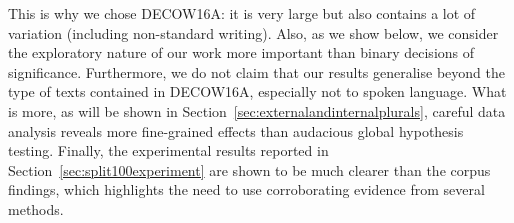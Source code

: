 This is why we chose DECOW16A: it is very large but also contains a lot of variation (including non-standard writing).
Also, as we show below, we consider the exploratory nature of our work more important than binary decisions of significance.
Furthermore, we do not claim that our results generalise beyond the type of texts contained in DECOW16A, especially not to spoken language.
What is more, as will be shown in Section~\ref{sec:externalandinternalplurals}, careful data analysis reveals more fine-grained effects than audacious global hypothesis testing.
Finally, the experimental results reported in Section~\ref{sec:split100experiment} are shown to be much clearer than the corpus findings, which highlights the need to use corroborating evidence from several methods.
